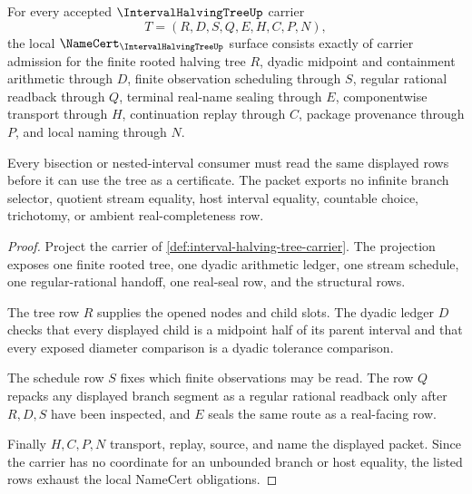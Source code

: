 \begin{theorem}
\label{thm:interval-halving-tree-namecert-obligations}
For every accepted $\IntervalHalvingTreeUp$ carrier
$$
T=(R,D,S,Q,E,H,C,P,N),
$$
the local $\NameCert_{\IntervalHalvingTreeUp}$ surface consists exactly of carrier admission for the finite rooted halving tree $R$, dyadic midpoint and containment arithmetic through $D$, finite observation scheduling through $S$, regular rational readback through $Q$, terminal real-name sealing through $E$, componentwise transport through $H$, continuation replay through $C$, package provenance through $P$, and local naming through $N$.

Every bisection or nested-interval consumer must read the same displayed rows before it can use the tree as a certificate. The packet exports no infinite branch selector, quotient stream equality, host interval equality, countable choice, trichotomy, or ambient real-completeness row.
\end{theorem}
\begin{proof}
Project the carrier of \autoref{def:interval-halving-tree-carrier}. The projection exposes one finite rooted tree, one dyadic arithmetic ledger, one stream schedule, one regular-rational handoff, one real-seal row, and the structural rows.

The tree row $R$ supplies the opened nodes and child slots. The dyadic ledger $D$ checks that every displayed child is a midpoint half of its parent interval and that every exposed diameter comparison is a dyadic tolerance comparison.

The schedule row $S$ fixes which finite observations may be read. The row $Q$ repacks any displayed branch segment as a regular rational readback only after $R,D,S$ have been inspected, and $E$ seals the same route as a real-facing row.

Finally $H,C,P,N$ transport, replay, source, and name the displayed packet. Since the carrier has no coordinate for an unbounded branch or host equality, the listed rows exhaust the local NameCert obligations.
\end{proof}


